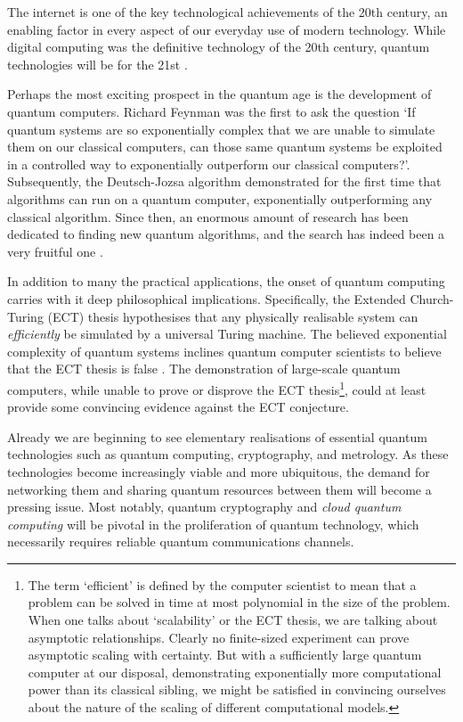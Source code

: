 \documentclass[aps,rmp,twocolumn,amsmath,amssymb,nofootinbib,superscriptaddress,longbibliography,floatfix]{revtex4-1}
\begin{document}
The internet is one of the key technological achievements of the 20th century, an enabling factor in every aspect of our everyday use of modern technology. While digital computing was the definitive technology of the 20th century, quantum technologies will be for the 21st \cite{bib:NielsenChuang00, bib:Bennett00}. 

Perhaps the most exciting prospect in the quantum age is the development of quantum computers. Richard Feynman \cite{bib:Feynman85} was the first to ask the question `If quantum systems are so exponentially complex that we are unable to simulate them on our classical computers, can those same quantum systems be exploited in a controlled way to exponentially outperform our classical computers?'. Subsequently, the Deutsch-Jozsa algorithm \cite{bib:DeutschJozsa92} demonstrated for the first time that algorithms can run on a quantum computer, exponentially outperforming any classical algorithm. Since then, an enormous amount of research has been dedicated to finding new quantum algorithms, and the search has indeed been a very fruitful one \cite{algorithmZoo}.

In addition to many the practical applications, the onset of quantum computing carries with it deep philosophical implications. Specifically, the Extended Church-Turing (ECT) thesis hypothesises that any physically realisable system can \emph{efficiently} be simulated by a universal Turing machine. The believed exponential complexity of quantum systems inclines quantum computer scientists to believe that the ECT thesis is false \cite{bib:Deutsch85}. The demonstration of large-scale quantum computers, while unable to prove or disprove the ECT thesis\footnote{The term `efficient' is defined by the computer scientist to mean that a problem can be solved in time at most polynomial in the size of the problem. When one talks about `scalability' or the ECT thesis, we are talking about asymptotic relationships. Clearly no finite-sized experiment can prove asymptotic scaling with certainty. But with a sufficiently large quantum computer at our disposal, demonstrating exponentially more computational power than its classical sibling, we might be satisfied in convincing ourselves about the nature of the scaling of different computational models.}, could at least provide some convincing evidence against the ECT conjecture.

Already we are beginning to see elementary realisations of essential quantum technologies such as quantum computing, cryptography, and metrology. As these technologies become increasingly viable and more ubiquitous, the demand for networking them and sharing quantum resources between them will become a pressing issue. Most notably, quantum cryptography and \emph{cloud quantum computing} will be pivotal in the proliferation of quantum technology, which necessarily requires reliable quantum communications channels.
\end{document}
